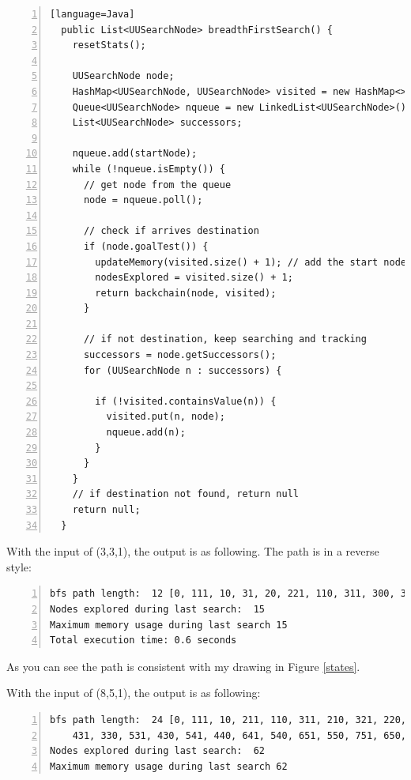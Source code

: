 \documentclass{article}
\begin{document}
\begin{lstlisting}[numbers=left][language=Java]
  public List<UUSearchNode> breadthFirstSearch() {
    resetStats();

    UUSearchNode node;
    HashMap<UUSearchNode, UUSearchNode> visited = new HashMap<>();
    Queue<UUSearchNode> nqueue = new LinkedList<UUSearchNode>();
    List<UUSearchNode> successors;

    nqueue.add(startNode);
    while (!nqueue.isEmpty()) {
      // get node from the queue
      node = nqueue.poll();

      // check if arrives destination
      if (node.goalTest()) {
        updateMemory(visited.size() + 1); // add the start node
        nodesExplored = visited.size() + 1;
        return backchain(node, visited);
      }

      // if not destination, keep searching and tracking
      successors = node.getSuccessors();
      for (UUSearchNode n : successors) {

        if (!visited.containsValue(n)) {
          visited.put(n, node);
          nqueue.add(n);
        }
      }
    }
    // if destination not found, return null
    return null;
  }
\end{lstlisting}

With the input of (3,3,1), the output is as following. The path is in a reverse style:

\begin{lstlisting}[numbers=left]
bfs path length:  12 [0, 111, 10, 31, 20, 221, 110, 311, 300, 321, 220, 331]
Nodes explored during last search:  15
Maximum memory usage during last search 15
Total execution time: 0.6 seconds
\end{lstlisting}

As you can see the path is consistent with my drawing in Figure \ref{states}.

With the input of (8,5,1), the output is as following:

\begin{lstlisting}[numbers=left]
bfs path length:  24 [0, 111, 10, 211, 110, 311, 210, 321, 220, 421, 320,
	431, 330, 531, 430, 541, 440, 641, 540, 651, 550, 751, 650, 851]
Nodes explored during last search:  62
Maximum memory usage during last search 62
\end{lstlisting}
\end{document}
